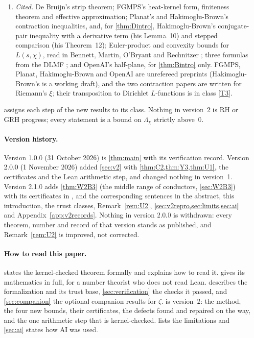 \documentclass[11pt]{article}
\theoremstyle{definition}
\newcommand{\Lc}{\Lambda}
\begin{document}
\begin{enumerate}[label=(T\arabic*)]
\item\label{T4} \emph{Cited.} De Bruijn's strip theorem; FGMPS's heat-kernel form, finiteness theorem and effective approximation; Planat's and Hakimoglu-Brown's contraction inequalities, and, for \cref{thm:Dintro}, Hakimoglu-Brown's conjugate-pair inequality with a derivative term (his Lemma~10) and stepped comparison (his Theorem~12); Euler-product and convexity bounds for $L(s,\chi)$, read in Bennett, Martin, O'Bryant and Rechnitzer \cite{BMOR2020}; three formulas from the DLMF \cite{DLMF}; and OpenAI's half-plane, for \cref{thm:Bintro} only. FGMPS, Planat, Hakimoglu-Brown and OpenAI are unrefereed preprints (Hakimoglu-Brown's is a working draft), and the two contraction papers are written for Riemann's $\xi$; their transposition to Dirichlet $L$-functions is in class \ref{T3}.
\end{enumerate}
 assigns each step of the new results to its class. Nothing in version~2 is RH or GRH progress; every statement is a bound on $\Lc_\chi$ strictly above~$0$.

\paragraph{Version history.} Version 1.0.0 (31 October 2026) is \cref{thm:main} with its verification record. Version 2.0.0 (1 November 2026) added \cref{sec:v2} with \cref{thm:C2,thm:Y3,thm:U1}, the certificates and the Lean arithmetic step, and changed nothing in version~1. Version 2.1.0 adds \cref{thm:W2B3} (the middle range of conductors, \cref{sec:W2B3}) with its certificates in , and the corresponding sentences in the abstract, this introduction, the trust classes, Remark~\ref{rem:U2}, \cref{sec:v2repro,sec:limits,sec:ai} and Appendix~\ref{app:v2records}. Nothing in version 2.0.0 is withdrawn: every theorem, number and record of that version stands as published, and Remark~\ref{rem:U2} is improved, not corrected.

\paragraph{How to read this paper.}  states the kernel-checked theorem formally and explains how to read it.  gives its mathematics in full, for a number theorist who does not read Lean.  describes the formalization and its trust base, \cref{sec:verification} the checks it passed, and \cref{sec:companion} the optional companion results for $\zeta$.  is version~2: the method, the four new bounds, their certificates, the defects found and repaired on the way, and the one arithmetic step that is kernel-checked.  lists the limitations and \cref{sec:ai} states how AI was used.
\end{document}
